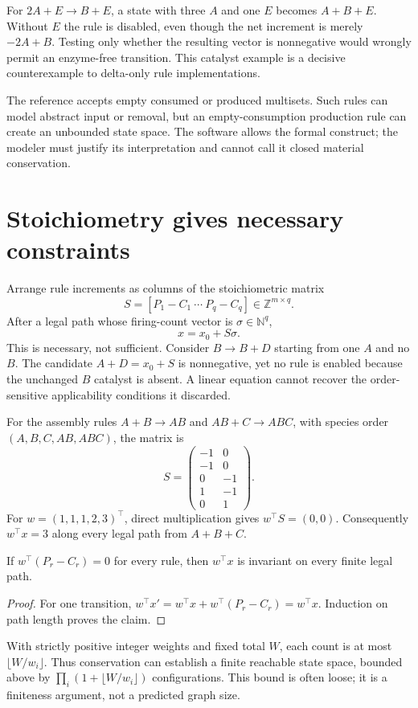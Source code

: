For $2A+E\to B+E$, a state with three $A$ and one $E$ becomes $A+B+E$.
Without $E$ the rule is disabled, even though the net increment is merely
$-2A+B$. Testing only whether the resulting vector is nonnegative would wrongly
permit an enzyme-free transition. This catalyst example is a decisive
counterexample to delta-only rule implementations.

The reference accepts empty consumed or produced multisets. Such rules can model
abstract input or removal, but an empty-consumption production rule can create an
unbounded state space. The software allows the formal construct; the modeler must
justify its interpretation and cannot call it closed material conservation.

\section{Stoichiometry gives necessary constraints}
Arrange rule increments as columns of the stoichiometric matrix
\[
S=[P_1-C_1\ \cdots\ P_q-C_q]\in\mathbb Z^{m\times q}.
\]
After a legal path whose firing-count vector is $\sigma\in\mathbb N^q$,
\[
x=x_0+S\sigma.
\]
This  is necessary, not sufficient. Consider $B\to B+D$
starting from one $A$ and no $B$. The candidate $A+D=x_0+S$ is nonnegative, yet no
rule is enabled because the unchanged $B$ catalyst is absent. A linear equation
cannot recover the order-sensitive applicability conditions it discarded.

For the assembly rules $A+B\to AB$ and $AB+C\to ABC$, with species order
$(A,B,C,AB,ABC)$, the matrix is
\[
S=\begin{pmatrix}
-1&0\\-1&0\\0&-1\\1&-1\\0&1
\end{pmatrix}.
\]
For $w=(1,1,1,2,3)^\top$, direct multiplication gives $w^\top S=(0,0)$.
Consequently $w^\top x=3$ along every legal path from $A+B+C$.


\begin{proposition}
If $w^\top(P_r-C_r)=0$ for every rule, then $w^\top x$ is invariant on every
finite legal path.
\end{proposition}
\begin{proof}
For one transition, $w^\top x'=w^\top x+w^\top(P_r-C_r)=w^\top x$.
Induction on path length proves the claim.
\end{proof}
With strictly positive integer weights and fixed total $W$, each count is at most
$\lfloor W/w_i\rfloor$. Thus conservation can establish a finite reachable state
space, bounded above by $\prod_i(1+\lfloor W/w_i\rfloor)$ configurations. This
bound is often loose; it is a finiteness argument, not a predicted graph size.

